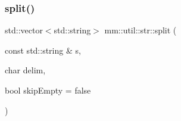 \subsubsection{\texorpdfstring{split()}{split()}\hspace{0.1cm}{\footnotesize\ttfamily [2/2]}}
{\footnotesize\ttfamily std\+::vector$<$std\+::string$>$ mm\+::util\+::str\+::split (\begin{DoxyParamCaption}\item[{const std\+::string \&}]{s,  }\item[{char}]{delim,  }\item[{bool}]{skip\+Empty = {\ttfamily false} }\end{DoxyParamCaption})}

